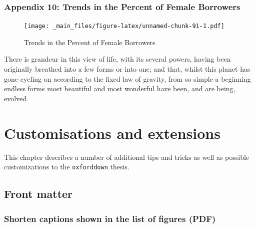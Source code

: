 \documentclass[a4paper, nobind]{templates/ociamthesis}
\begin{document}
\begin{landscape}

\newpage

\hypertarget{appendix-10-trends-in-the-percent-of-female-borrowers}{%
\subsection{Appendix 10: Trends in the Percent of Female Borrowers}\label{appendix-10-trends-in-the-percent-of-female-borrowers}}

\begin{figure}
\centering
\texttt{[image: \_main\_files/figure-latex/unnamed-chunk-91-1.pdf]}
\caption{\label{fig:unnamed-chunk-91}Trends in the Percent of Female Borrowers}
\end{figure}

\end{landscape}

\begin{savequote}
There is grandeur in this view of life, with its several powers, having
been originally breathed into a few forms or into one; and that, whilst
this planet has gone cycling on according to the fixed law of gravity,
from so simple a beginning endless forms most beautiful and most
wonderful have been, and are being, evolved.
\end{savequote}



\hypertarget{customisations-and-extensions}{%
\chapter{Customisations and extensions}\label{customisations-and-extensions}}

\minitoc 

\noindent This chapter describes a number of additional tips and tricks as well as possible customizations to the \texttt{oxforddown} thesis.

\hypertarget{front-matter}{%
\section{Front matter}\label{front-matter}}

\hypertarget{shorten-captions-shown-in-the-list-of-figures-pdf}{%
\subsection{Shorten captions shown in the list of figures (PDF)}\label{shorten-captions-shown-in-the-list-of-figures-pdf}}
\end{document}
